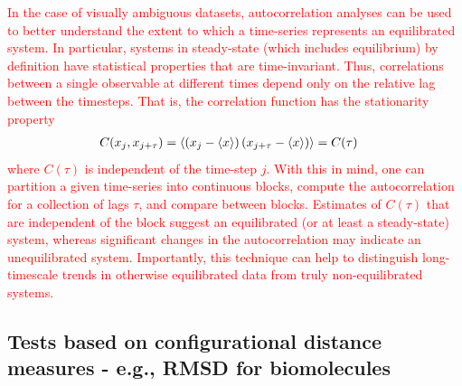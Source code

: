 \textcolor{red}{In the case of visually ambiguous datasets, autocorrelation analyses can be used to better understand the extent to which a time-series represents an equilibrated system.  In particular, systems in steady-state (which includes equilibrium) by definition have statistical properties that are time-invariant.  Thus, correlations between a single observable at different times depend only on the relative lag between the timesteps.  That is, the correlation function has the stationarity property}
\begin{align}
C(x_j,x_{j+\tau}) &= \langle  \left(x_j - \langle x \rangle \right) \left(x_{j+\tau} - \langle x \rangle \right)  \rangle = C(\tau)
\end{align}
\textcolor{red}{where $C(\tau)$ is independent of the time-step $j$.  With this in mind, one can partition a given time-series into continuous blocks, compute the autocorrelation for a collection of lags $\tau$, and compare between blocks.  Estimates of $C(\tau)$ that are independent of the block suggest an equilibrated (or at least a steady-state) system, whereas significant changes in the autocorrelation may indicate an unequilibrated system.  Importantly, this technique can help to distinguish long-timescale trends in otherwise equilibrated data from truly non-equilibrated systems.}

\subsection{Tests based on configurational distance measures - e.g., RMSD for biomolecules}
\label{sec:bio_RMSD}

